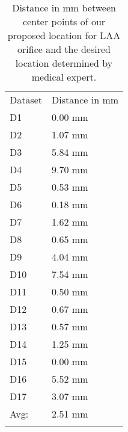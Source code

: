 \begin{table}[t]
  \centering
  \caption{Distance in mm between center points of our proposed
  location for LAA orifice and the desired location determined by 
  medical expert.} 
  \label{tab:cutdistances}
\begin{tabular}{ll} 
  \hline\noalign{\smallskip}
  Dataset & Distance in mm  \\
  \noalign{\smallskip}\hline\noalign{\smallskip}
  D1 & 0.00 mm \\
  D2 & 1.07 mm \\
  D3 & 5.84 mm \\
  D4 & 9.70 mm \\
  D5 & 0.53 mm \\
  D6 & 0.18 mm \\
  D7 & 1.62 mm \\
  D8 & 0.65 mm \\
  D9 & 4.04 mm \\
  D10 & 7.54 mm \\
  D11 & 0.50 mm \\
  D12 & 0.67 mm \\
  D13 & 0.57 mm \\
  D14 & 1.25 mm \\
  D15 & 0.00 mm \\
  D16 & 5.52 mm \\
  D17 & 3.07 mm \\
  Avg: & 2.51 mm \\
  \noalign{\smallskip}\hline
\end{tabular}
\end{table}
